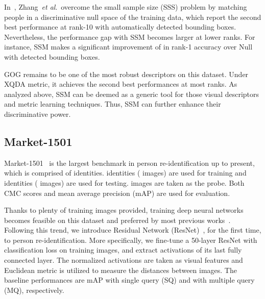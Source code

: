 \documentclass[10pt,twocolumn,letterpaper]{article}
\def\etal{\emph{et al}.}
\begin{document}
In~\cite{null}, Zhang~\etal~overcome the small sample size (SSS) problem by matching people in a discriminative null space of the training data, which report the second best performance  at rank-10 with automatically detected bounding boxes. Nevertheless, the performance gap with SSM becomes larger at lower ranks. For instance, SSM makes a significant improvement of  in rank-1 accuracy over Null~\cite{null} with detected bounding boxes.

GOG remains to be one of the most robust descriptors on this dataset. Under XQDA metric, it achieves the second best performances at most ranks. As analyzed above, SSM can be deemed as a generic tool for those visual descriptors and metric learning techniques. Thus, SSM can further enhance their discriminative power.

\subsection{Market-1501}
Market-1501~\cite{market1501} is the largest benchmark in person re-identification up to present, which is comprised of  identities.  identities ( images) are used for training and  identities ( images) are used for testing.  images are taken as the probe. Both CMC scores and mean average precision (mAP) are used for evaluation.

Thanks to plenty of training images provided, training deep neural networks becomes feasible on this dataset and preferred by most previous works~\cite{SuChi2,S-LSTM,S-CNN}. Following this trend, we introduce Residual Network (ResNet)~\cite{ResNet}, for the first time, to person re-identification.
More specifically, we fine-tune a 50-layer ResNet with classification loss on training images, and extract activations of its last fully connected layer. The  normalized activations are taken as visual features and Euclidean metric is utilized to measure the distances between images. The baseline performances are mAP  with single query (SQ) and  with multiple query (MQ), respectively.
\end{document}
